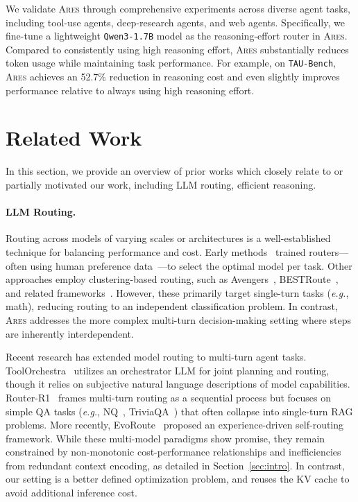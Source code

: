 \documentclass{article}
\newcommand{\ares}{\textsc{Ares}}
\theoremstyle{plain}
\theoremstyle{definition}
\theoremstyle{remark}
\begin{document}
We validate {\ares} through comprehensive experiments across diverse agent tasks, including tool-use agents, deep-research agents, and web agents. Specifically, we fine-tune a lightweight \texttt{Qwen3-1.7B} model as the reasoning-effort router in {\ares}. Compared to consistently using high reasoning effort, {\ares} substantially reduces token usage while maintaining task performance. For example, on \texttt{TAU-Bench}, {\ares} achieves an 52.7\% reduction in reasoning cost and even slightly improves performance relative to always using high reasoning effort.




\section{Related Work}
In this section, we provide an overview of prior works which closely relate to or partially motivated our work, including LLM routing, efficient reasoning.

\paragraph{LLM Routing.}
Routing across models of varying scales or architectures is a well-established technique for balancing performance and cost. Early methods~\citep{srivatsa2024harnessing,ong2024routellm,feng2024graphrouter} trained routers—often using human preference data~\citep{chiang2024chatbot}—to select the optimal model per task. Other approaches employ clustering-based routing, such as Avengers~\citep{zhang2025avengers}, BESTRoute~\citep{ding2025best}, and related frameworks~\citep{jitkrittum2025universal}. However, these primarily target single-turn tasks (\emph{e.g.}, math), reducing routing to an independent classification problem. In contrast, \textsc{Ares} addresses the more complex multi-turn decision-making setting where steps are inherently interdependent.

Recent research has extended model routing to multi-turn agent tasks. ToolOrchestra~\citep{su2025toolorchestra} utilizes an orchestrator LLM for joint planning and routing, though it relies on subjective natural language descriptions of model capabilities. Router-R1~\citep{zhang2025router} frames multi-turn routing as a sequential process but focuses on simple QA tasks (\emph{e.g.}, NQ~\citep{kwiatkowski2019natural}, TriviaQA~\citep{joshi2017triviaqa}) that often collapse into single-turn RAG problems. More recently, EvoRoute~\citep{zhang2026evoroute} proposed an experience-driven self-routing framework. While these multi-model paradigms show promise, they remain constrained by non-monotonic cost-performance relationships and inefficiencies from redundant context encoding, as detailed in Section~\ref{sec:intro}. In contrast, our setting is a better defined optimization problem, and reuses the KV cache to avoid additional inference cost.
\end{document}
